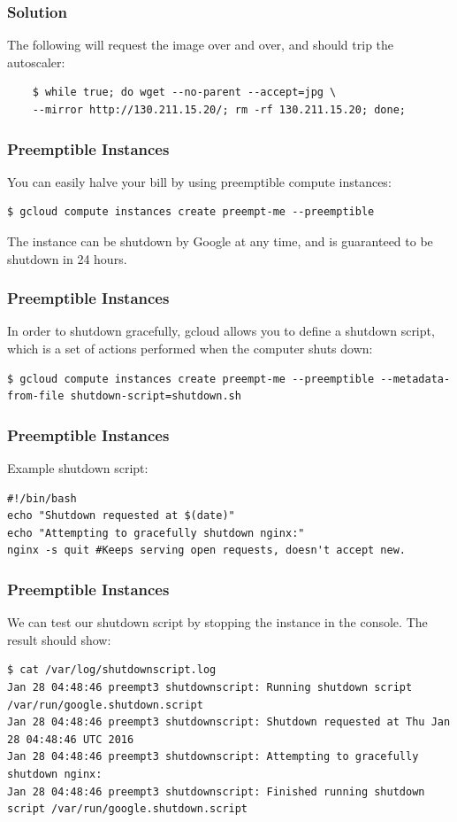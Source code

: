 \documentclass[9pt]{beamer}
\begin{document}
\begin{frame}[fragile]
  \frametitle{Solution}
  The following will request the image over and over, and should trip the autoscaler:
  \begin{verbatim}
    $ while true; do wget --no-parent --accept=jpg \
    --mirror http://130.211.15.20/; rm -rf 130.211.15.20; done;
  \end{verbatim}
\end{frame}

\begin{frame}[fragile]
\frametitle{Preemptible Instances}
You can easily halve your bill by using preemptible compute instances:
\begin{verbatim}
$ gcloud compute instances create preempt-me --preemptible
\end{verbatim}
The instance can be shutdown by Google at any time, and is guaranteed to be shutdown in 24 hours.
\end{frame}

\begin{frame}[fragile]
\frametitle{Preemptible Instances}
In order to shutdown gracefully, gcloud allows you to define a shutdown script, which is a set of actions performed when the computer shuts down:
\begin{verbatim}
$ gcloud compute instances create preempt-me --preemptible --metadata-from-file shutdown-script=shutdown.sh
\end{verbatim}
\end{frame}

\begin{frame}[fragile]
\frametitle{Preemptible Instances}
Example shutdown script:
\begin{verbatim}
#!/bin/bash
echo "Shutdown requested at $(date)"
echo "Attempting to gracefully shutdown nginx:"
nginx -s quit #Keeps serving open requests, doesn't accept new.
\end{verbatim}
\end{frame}

\begin{frame}[fragile]
\frametitle{Preemptible Instances}
We can test our shutdown script by stopping the instance in the console. The result should show:
\begin{verbatim}
$ cat /var/log/shutdownscript.log
Jan 28 04:48:46 preempt3 shutdownscript: Running shutdown script /var/run/google.shutdown.script
Jan 28 04:48:46 preempt3 shutdownscript: Shutdown requested at Thu Jan 28 04:48:46 UTC 2016
Jan 28 04:48:46 preempt3 shutdownscript: Attempting to gracefully shutdown nginx:
Jan 28 04:48:46 preempt3 shutdownscript: Finished running shutdown script /var/run/google.shutdown.script
\end{verbatim}
\end{frame}
\end{document}

